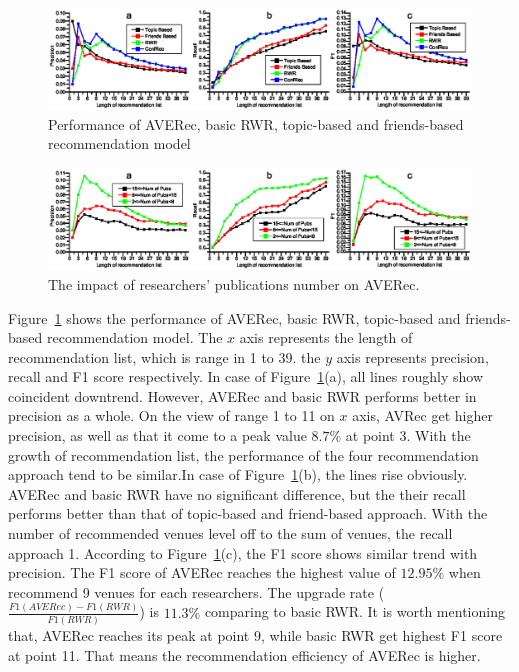 \documentclass[9pt]{acm_proc_article-sp}
\begin{document}
\begin{figure}[t]
\centering
\includegraphics [width=\textwidth]{Fig4.eps}
\caption{Performance of AVERec, basic RWR, topic-based and friends-based recommendation model}
\label{fig4}
\end{figure}

\begin{figure}[t]
\centering
\includegraphics [width=\textwidth]{Fig5.eps}
\caption{The impact of researchers' publications number on AVERec.}
\label{fig5}
\end{figure}

Figure~\ref{fig4} shows the performance of AVERec, basic RWR, topic-based and friends-based recommendation model. The $x$ axis represents the length of recommendation list, which is range in 1 to 39. the $y$ axis represents precision, recall and F1 score respectively. In case of Figure~\ref{fig4}(a), all lines roughly show coincident downtrend. However, AVERec and basic RWR performs better in precision as a whole. On the view of range 1 to 11 on $x$ axis, AVRec get higher precision, as well as that it come to a peak value $8.7\%$ at point 3. With the growth of recommendation list, the performance of the four recommendation approach tend to be similar.In case of Figure~\ref{fig4}(b), the lines rise obviously. AVERec and basic RWR have no significant difference, but the their recall performs better than that of topic-based and friend-based approach. With the number of recommended venues level off to the sum of venues, the recall approach 1. According to Figure~\ref{fig4}(c), the F1 score shows similar trend with precision. The F1 score of AVERec reaches the highest value of $12.95\%$ when recommend 9 venues for each researchers. The upgrade rate ($\frac{F1(AVERec)-F1(RWR)}{F1(RWR)}$) is $11.3\%$ comparing to basic RWR. It is worth mentioning that, AVERec reaches its peak at point 9, while basic RWR get highest F1 score at point 11. That means the recommendation efficiency of AVERec is higher.
\end{document}
